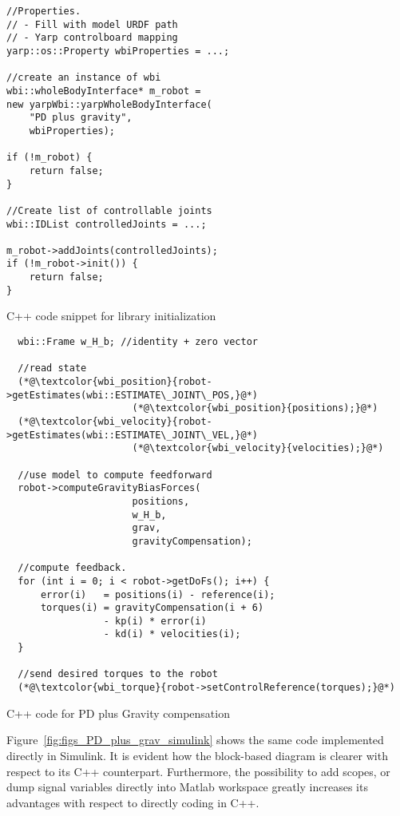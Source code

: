 \begin{algorithm}
    \centering
\begin{lstlisting}
//Properties.
// - Fill with model URDF path
// - Yarp controlboard mapping
yarp::os::Property wbiProperties = ...;

//create an instance of wbi
wbi::wholeBodyInterface* m_robot =
new yarpWbi::yarpWholeBodyInterface(
    "PD plus gravity", 
    wbiProperties);
    
if (!m_robot) {
    return false;
}

//Create list of controllable joints
wbi::IDList controlledJoints = ...;

m_robot->addJoints(controlledJoints);
if (!m_robot->init()) {
    return false;
}

\end{lstlisting}
\caption{C++ code snippet for library initialization}
\label{code:wbi_init}
\end{algorithm}

\begin{algorithm}
    \centering
\begin{lstlisting}
  wbi::Frame w_H_b; //identity + zero vector
  
  //read state
  (*@\textcolor{wbi_position}{robot->getEstimates(wbi::ESTIMATE\_JOINT\_POS,}@*)
                      (*@\textcolor{wbi_position}{positions);}@*)
  (*@\textcolor{wbi_velocity}{robot->getEstimates(wbi::ESTIMATE\_JOINT\_VEL,}@*)
                      (*@\textcolor{wbi_velocity}{velocities);}@*)
  
  //use model to compute feedforward
  robot->computeGravityBiasForces(
                      positions, 
                      w_H_b, 
                      grav,
                      gravityCompensation);
  
  //compute feedback.
  for (int i = 0; i < robot->getDoFs(); i++) {
      error(i)   = positions(i) - reference(i);
      torques(i) = gravityCompensation(i + 6) 
                 - kp(i) * error(i) 
                 - kd(i) * velocities(i);
  }
  
  //send desired torques to the robot
  (*@\textcolor{wbi_torque}{robot->setControlReference(torques);}@*)

\end{lstlisting}
\caption{C++ code for PD plus Gravity compensation}
\label{code:cpp_pd_plus_grav}
\end{algorithm}

Figure~\ref{fig:figs_PD_plus_grav_simulink} shows the same code implemented directly in Simulink.
It is evident how the block-based diagram is clearer with respect to its C++ counterpart.
Furthermore, the possibility to add scopes, or dump signal variables directly into Matlab workspace greatly increases its advantages with respect to directly coding in C++.

